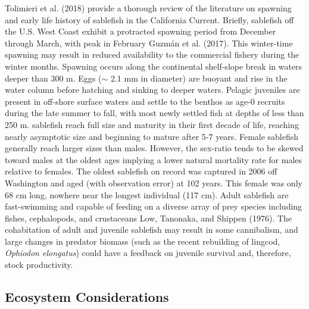 \documentclass[11pt,
  english,
  a4paper,
]{article}
\begin{document}
\leavevmode\tagmcend\tagstructend


{Tolimieri et al. (2018)\leavevmode\tagmcend\tagstructend} provide a thorough review of the literature on spawning and early life history of sablefish in the California Current. Briefly, sablefish off the U.S. West Coast exhibit a protracted spawning period from December through March, with peak in February {Guzmán et al. (2017)\leavevmode\tagmcend\tagstructend}. This winter-time spawning may result in reduced availability to the commercial fishery during the winter months. Spawning occurs along the continental shelf-slope break in waters deeper than 300 m. Eggs ({\(\sim\)\leavevmode\tagmcend\tagstructend} 2.1 mm in diameter) are buoyant and rise in the water column before hatching and sinking to deeper waters. Pelagic juveniles are present in off-shore surface waters and settle to the benthos as age-0 recruits during the late summer to fall, with most newly settled fish at depths of less than 250 m. sablefish reach full size and maturity in their first decade of life, reaching nearly asymptotic size and beginning to mature after 5-7 years. Female sablefish generally reach larger sizes than males. However, the sex-ratio tends to be skewed toward males at the oldest ages implying a lower natural mortality rate for males relative to females. The oldest sablefish on record was captured in 2006 off Washington and aged (with observation error) at 102 years. This female was only 68 cm long, nowhere near the longest individual (117 cm). Adult sablefish are fast-swimming and capable of feeding on a diverse array of prey species including fishes, cephalopods, and crustaceans {Low, Tanonaka, and Shippen (1976)\leavevmode\tagmcend\tagstructend}. The cohabitation of adult and juvenile sablefish may result in some cannibalism, and large changes in predator biomass (such as the recent rebuilding of lingcod, \emph{Ophiodon elongatus}) could have a feedback on juvenile survival and, therefore, stock productivity.

\leavevmode\tagmcend\tagstructend\par


\hypertarget{ecosystem-considerations}{%
\subsection{Ecosystem Considerations}\label{ecosystem-considerations}}
\end{document}
